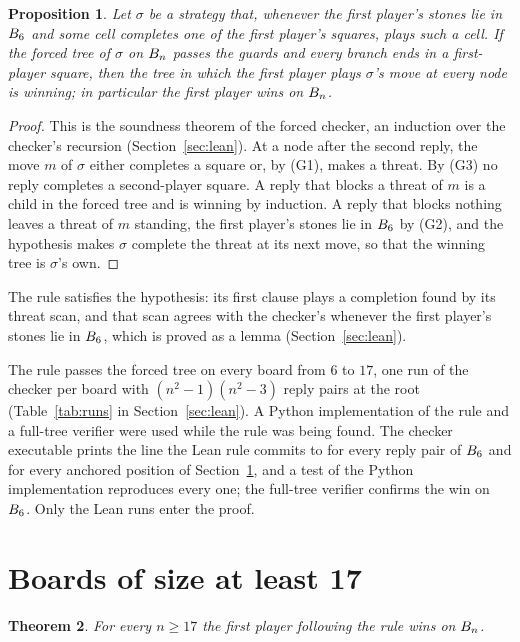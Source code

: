 \documentclass[11pt]{amsart}
\newtheorem{theorem}{Theorem}[section]
\newtheorem{proposition}[theorem]{Proposition}
\theoremstyle{definition}
\theoremstyle{remark}
\begin{document}
\begin{proposition}\label{prop:forced}
Let $\sigma$ be a strategy that, whenever the first player's stones lie
in $B_6$ and some cell completes one of the first player's
squares, plays such a cell. If the forced tree of $\sigma$ on
$B_n$ passes the guards and every branch ends in a first-player
square, then the tree in which the first player plays $\sigma$'s move
at every node is winning; in particular the first player wins on
$B_n$.
\end{proposition}

\begin{proof}
This is the soundness theorem of the forced checker, an induction over
the checker's recursion (Section~\ref{sec:lean}). At a node after the
second reply, the move $m$ of $\sigma$ either completes a square or, by
(G1), makes a threat. By (G3) no reply completes a second-player
square. A reply that blocks a threat of $m$ is a child in the forced
tree and is winning by induction. A reply that blocks nothing leaves a
threat of $m$ standing, the first player's stones lie in $B_6$ by
(G2), and the hypothesis makes $\sigma$ complete the threat at its next
move, so that the winning tree is $\sigma$'s own.
\end{proof}

The rule satisfies the hypothesis: its first clause plays a completion
found by its threat scan, and that scan agrees with the checker's
whenever the first player's stones lie in $B_6$, which is proved
as a lemma (Section~\ref{sec:lean}).

The rule passes the forced tree on every board from $6$ to $17$, one
run of the checker per board with $(n^2-1)(n^2-3)$ reply pairs at the
root (Table~\ref{tab:runs} in Section~\ref{sec:lean}). A Python
implementation of the rule and a full-tree verifier were used while the
rule was being found. The checker executable prints the line the Lean
rule commits to for every reply pair of $B_6$ and for every
anchored position of Section~\ref{sec:uniform}, and a test of the
Python implementation reproduces every one; the full-tree verifier
confirms the win on $B_6$. Only the Lean runs enter the proof.

\section{Boards of size at least 17}\label{sec:uniform}

\begin{theorem}\label{thm:uniform}
For every $n \ge 17$ the first player following the rule wins on
$B_n$.
\end{theorem}
\end{document}
